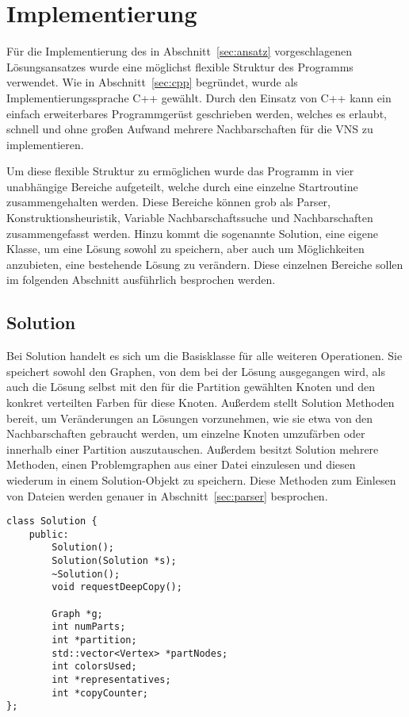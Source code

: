 \chapter{Implementierung}
Für die Implementierung des in Abschnitt~\ref{sec:ansatz} vorgeschlagenen Lösungsansatzes wurde eine möglichst flexible Struktur des Programms verwendet. Wie in Abschnitt~\ref{sec:cpp} begründet, wurde
als Implementierungssprache C++ gewählt. Durch den Einsatz von C++ kann ein einfach erweiterbares Programmgerüst geschrieben werden, welches es erlaubt, schnell und ohne großen Aufwand mehrere Nachbarschaften
für die VNS zu implementieren. 

Um diese flexible Struktur zu ermöglichen wurde das Programm in vier unabhängige Be\-rei\-che aufgeteilt, welche durch eine einzelne Startroutine zusammengehalten werden. Diese Be\-rei\-che können grob als Parser, 
Konstruktionsheuristik, Variable Nachbarschaftssuche und Nachbarschaften zusammengefasst werden. Hinzu kommt die sogenannte Solution, eine eigene Klasse, um eine Lösung sowohl zu speichern, aber auch um Möglichkeiten
anzubieten, eine bestehende Lösung zu verändern. Diese einzelnen Be\-rei\-che sollen im folgenden Abschnitt ausführlich besprochen werden.

\section{Solution}
Bei Solution handelt es sich um die Basisklasse für alle weiteren Operationen. Sie speichert sowohl den Graphen, von dem bei der Lösung ausgegangen wird, als auch die Lösung selbst mit den für die Partition gewählten Knoten und den konkret verteilten Farben
für diese Knoten. Außerdem stellt Solution Methoden bereit, um Veränderungen an Lösungen vorzunehmen, wie sie etwa von den Nachbarschaften gebraucht werden, um einzelne Knoten umzufärben oder innerhalb einer Partition auszutauschen.
Außerdem besitzt Solution mehrere Methoden, einen Problemgraphen aus einer Datei einzulesen und diesen wiederum in einem Solution-Objekt zu speichern. Diese Methoden zum Einlesen von Dateien werden genauer 
in Abschnitt~\ref{sec:parser} besprochen.

\singlespacing
\begin{lstlisting}[caption={Ein Ausschnitt aus der Signatur der Solutionklasse},label=lst:solution]
class Solution {
	public:
		Solution();
		Solution(Solution *s);
		~Solution(); 
		void requestDeepCopy();

		Graph *g;
		int numParts;
		int *partition;
		std::vector<Vertex> *partNodes;
		int colorsUsed;
		int *representatives;
		int *copyCounter;
};
\end{lstlisting}

